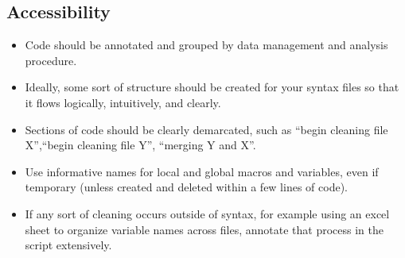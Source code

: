 \subsection{Accessibility}
\begin{itemize}
	\item Code should be annotated and grouped by data management and analysis procedure.
	\item Ideally, some sort of structure should be created for your syntax files so that it flows logically, intuitively, and clearly.
	\item Sections of code should be clearly demarcated, such as ``begin cleaning file X'',``begin cleaning file Y'', ``merging Y and X''.
	\item Use informative names for local and global macros and variables, even if temporary (unless created and deleted within a few lines of code).
	\item If any sort of cleaning occurs outside of syntax, for example using an excel sheet to organize variable names across files, annotate that process in the script extensively.
\end{itemize}

